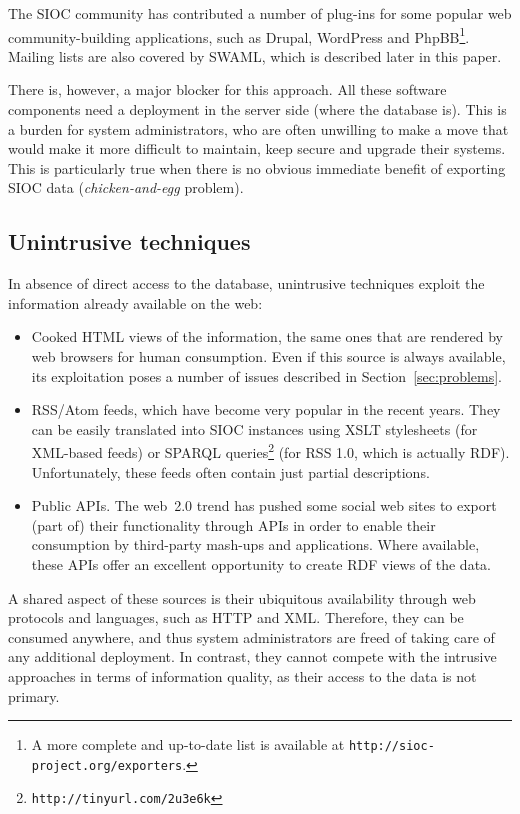 \documentclass{../templates/www2008-submission}
\begin{document}
The SIOC community has contributed a number of plug-ins for some
popular web community-building applications, such as Drupal, WordPress and 
PhpBB\footnote{A more complete and up-to-date list is available
at \texttt{http://sioc-project.org/exporters}.}. Mailing lists are
also covered by SWAML, which is described later in this paper.

There is, however, a major blocker for this approach. All these
software components need a deployment in the server side (where
the database is). This is a burden for system administrators, who
are often unwilling to make a move that would make it more difficult to
maintain, keep secure and upgrade their systems. This is particularly
true when there is no obvious immediate benefit of exporting
SIOC data (\emph{chicken-and-egg} problem).

\subsection{Unintrusive techniques}

In absence of direct access to the database, unintrusive
techniques exploit the information already available on the web:

\begin{itemize}

\item Cooked HTML views of the information, the same ones that
are rendered by web browsers for human consumption. Even if this 
source is always available, its exploitation poses a number of 
issues described in Section~\ref{sec:problems}.

\item RSS/Atom feeds, which have become very popular in the recent years.
They can be easily
translated into SIOC instances using XSLT stylesheets (for XML-based feeds) or 
SPARQL queries\footnote{\texttt{http://tinyurl.com/2u3e6k}} (for RSS 1.0, 
which is actually RDF). Unfortunately, these feeds often contain just 
partial descriptions.

\item Public APIs. The web~2.0 trend has pushed some social web
sites to export (part of) their functionality through APIs
in order to enable their consumption by third-party mash-ups and applications.
Where available, these APIs offer an excellent opportunity to
create RDF views of the data.

\end{itemize}

A shared aspect of these sources is their ubiquitous availability through
web protocols and languages, such as HTTP and XML. Therefore, they
can be consumed anywhere, and thus system administrators are freed of
taking care of any additional deployment. In contrast, they cannot compete
with the intrusive approaches in terms of information quality, as
their access to the data is not primary.
\end{document}
